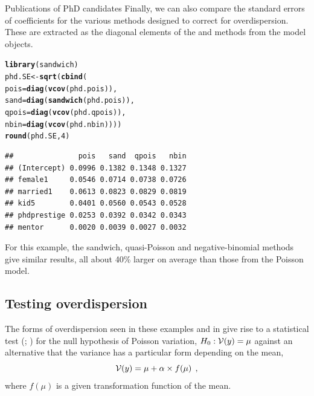 \documentclass[11pt]{book}\usepackage[]{graphicx}\usepackage[]{color}
\makeatletter
\newcommand{\hlnum}[1]{\textcolor[rgb]{0.686,0.059,0.569}{#1}}%
\newcommand{\hlstd}[1]{\textcolor[rgb]{0.345,0.345,0.345}{#1}}%
\newcommand{\hlkwb}[1]{\textcolor[rgb]{0.69,0.353,0.396}{#1}}%
\newcommand{\hlkwc}[1]{\textcolor[rgb]{0.333,0.667,0.333}{#1}}%
\newcommand{\hlkwd}[1]{\textcolor[rgb]{0.737,0.353,0.396}{\textbf{#1}}}%
\newenvironment{kframe}{%
 \def\at@end@of@kframe{}%
 \ifinner\ifhmode%
  \def\at@end@of@kframe{\end{minipage}}%
  \begin{minipage}{\columnwidth}%
 \fi\fi%
 \def\FrameCommand##1{\hskip\@totalleftmargin \hskip-\fboxsep
 \colorbox{shadecolor}{##1}\hskip-\fboxsep
     \hskip-\linewidth \hskip-\@totalleftmargin \hskip\columnwidth}%
 \MakeFramed {\advance\hsize-\width
   \@totalleftmargin\z@ \linewidth\hsize
   \@setminipage}}%
 {\par\unskip\endMakeFramed%
 \at@end@of@kframe}
\newenvironment{knitrout}{}{} %
\renewenvironment{knitrout}{\small\renewcommand{\baselinestretch}{.85}}{} %
\makeatother
\begin{document}
\begin{Example}[phdpubs3]{Publications of PhD candidates}
Finally, we can also compare the standard errors of coefficients
for the various methods designed to correct for overdispersion.  These are extracted
as the diagonal elements of the  and  methods from the model objects.
\begin{knitrout}
\color{fgcolor}\begin{kframe}
\begin{alltt}
\hlkwd{library}\hlstd{(sandwich)}
\hlstd{phd.SE} \hlkwb{<-} \hlkwd{sqrt}\hlstd{(}\hlkwd{cbind}\hlstd{(}
  \hlkwc{pois}\hlstd{=}\hlkwd{diag}\hlstd{(}\hlkwd{vcov}\hlstd{(phd.pois)),}
  \hlkwc{sand}\hlstd{=}\hlkwd{diag}\hlstd{(}\hlkwd{sandwich}\hlstd{(phd.pois)),}
  \hlkwc{qpois}\hlstd{=}\hlkwd{diag}\hlstd{(}\hlkwd{vcov}\hlstd{(phd.qpois)),}
  \hlkwc{nbin}\hlstd{=}\hlkwd{diag}\hlstd{(}\hlkwd{vcov}\hlstd{(phd.nbin))))}
\hlkwd{round}\hlstd{(phd.SE,}\hlnum{4}\hlstd{)}
\end{alltt}
\begin{verbatim}
##               pois   sand  qpois   nbin
## (Intercept) 0.0996 0.1382 0.1348 0.1327
## female1     0.0546 0.0714 0.0738 0.0726
## married1    0.0613 0.0823 0.0829 0.0819
## kid5        0.0401 0.0560 0.0543 0.0528
## phdprestige 0.0253 0.0392 0.0342 0.0343
## mentor      0.0020 0.0039 0.0027 0.0032
\end{verbatim}
\end{kframe}
\end{knitrout}
For this example, the sandwich, quasi-Poisson and negative-binomial methods give similar results,
all about 40\% larger on average than those from the Poisson model.
\end{Example}

\subsection{Testing overdispersion}\label{sec:glm-disptest}

The forms of overdispersion seen in these examples and in 
give rise to a statistical test
(\citealt{CameronTrivedi:1990}; \citealt[\S 3.4]{CameronTrivedi:1998})
for the
null hypothesis of Poisson variation, $H_0 : \mathcal{V}(y) = \mu$ against an alternative that the variance
has a particular form depending on the mean,
\begin{equation*}
\mathcal{V}(y) = \mu + \alpha \times f(\mu) \:\: ,
\end{equation*}
where $f(\mu)$ is a given transformation function of the mean.
\end{document}
